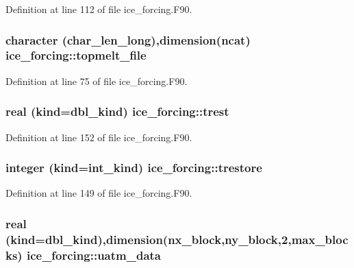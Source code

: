 Definition at line 112 of file ice\_\-forcing.F90.\hypertarget{namespaceice__forcing_a22a86e9e628aeff874655d16792b2637}{
\subsubsection[{topmelt\_\-file}]{\setlength{\rightskip}{0pt plus 5cm}character (char\_\-len\_\-long),dimension(ncat) {\bf ice\_\-forcing::topmelt\_\-file}}}
\label{namespaceice__forcing_a22a86e9e628aeff874655d16792b2637}


Definition at line 75 of file ice\_\-forcing.F90.\hypertarget{namespaceice__forcing_a6a5e91929910782bb955be2569a01a35}{
\subsubsection[{trest}]{\setlength{\rightskip}{0pt plus 5cm}real (kind=dbl\_\-kind) {\bf ice\_\-forcing::trest}}}
\label{namespaceice__forcing_a6a5e91929910782bb955be2569a01a35}


Definition at line 152 of file ice\_\-forcing.F90.\hypertarget{namespaceice__forcing_a5a4e01d0d2029ae1b1f11eb0c3ce5d8c}{
\subsubsection[{trestore}]{\setlength{\rightskip}{0pt plus 5cm}integer (kind=int\_\-kind) {\bf ice\_\-forcing::trestore}}}
\label{namespaceice__forcing_a5a4e01d0d2029ae1b1f11eb0c3ce5d8c}


Definition at line 149 of file ice\_\-forcing.F90.\hypertarget{namespaceice__forcing_a3e020efe327d9945b65433fa30d543ef}{
\subsubsection[{uatm\_\-data}]{\setlength{\rightskip}{0pt plus 5cm}real (kind=dbl\_\-kind),dimension(nx\_\-block,ny\_\-block,2,max\_\-blocks) {\bf ice\_\-forcing::uatm\_\-data}}}
\label{namespaceice__forcing_a3e020efe327d9945b65433fa30d543ef}



